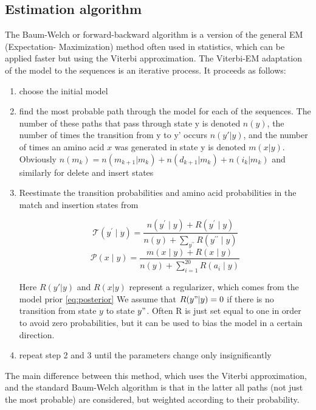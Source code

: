 \subsection{Estimation algorithm}
The Baum-Welch or forward-backward algorithm is a version of the general EM (Expectation- Maximization) method often used in statistics, which can be applied faster but using the Viterbi approximation.
The Viterbi-EM adaptation of the model to the sequences is an iterative process.
It proceeds as follows:
\begin{enumerate}
\item choose the initial model
\item find the most probable path through the model for each of the sequences. The number of these paths that pass through state y is denoted $n(y)$, the number of times the transition from y to y' occurs $n(y'|y)$, and the number of times an amino acid $x$ was generated in state y is denoted $m(x|y)$. Obviously $n(m_k) = n(m_{k+1}|m_k)+n(d_{k+1} | m_k)+n(i_k|m_k)$ and similarly for delete and insert states
\item Reestimate the transition probabilities and amino acid probabilities in the match and insertion states from

\begin{equation}\label{eq:T}
\mathcal{T}\left(y^{\prime} \mid y\right) =\frac{n\left(y^{\prime} \mid y\right)+R\left(y^{\prime} \mid y\right)}{n(y)+\sum_{y^{\prime \prime}} R\left(y^{\prime \prime} \mid y\right)} 
\end{equation}
\begin{equation}\label{eq:P}
\mathcal{P}(x \mid y) =\frac{m(x \mid y)+R(x \mid y)}{n(y)+\sum_{i=1}^{20} R\left(a_{i} \mid y\right)}
\end{equation}

Here $R(y'|y)$ and $R(x|y)$ represent a regularizer, which comes from the model prior \ref{eq:posterior} We assume that $R(y"|y) = 0$ if there is no transition from state $y$ to state $y"$. Often R is just set equal to one in order to avoid zero probabilities, but it can be used to bias the model in a certain direction.
\item repeat step 2 and 3 until the parameters change only insignificantly
\end{enumerate}
The main difference between this method, which uses the Viterbi approximation, and the standard Baum-Welch algorithm is that in the latter all paths (not just the most probable) are considered, but weighted according to their probability.

